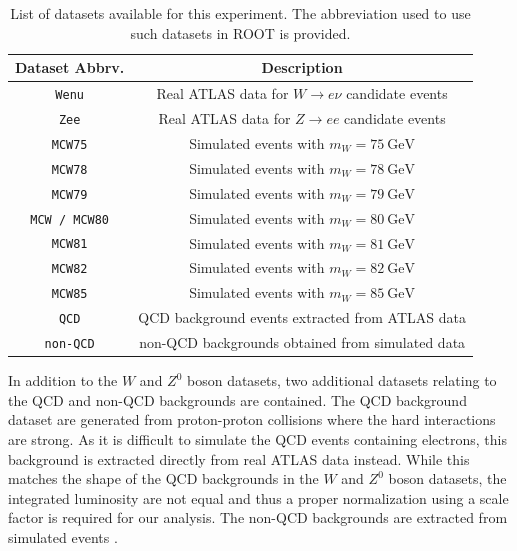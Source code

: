 \documentclass[a4paper]{report}
\numberwithin{equation}{section}
\begin{document}
\begin{table}
    \centering
    \begin{tabular}{|c|c|}  \hline
     Dataset Abbrv.& Description    \\ \hline
     \texttt{Wenu} &  Real ATLAS data for  $W \rightarrow e\nu$ candidate events \\
     \texttt{Zee} &  Real ATLAS data for  $Z \rightarrow ee$ candidate events  \\ 
     \texttt{MCW75} &  Simulated events with $m_W = \SI{75}{\giga\electronvolt}$ \\ 
     \texttt{MCW78} &  Simulated events with $m_W = \SI{78}{\giga\electronvolt}$ \\ 
     \texttt{MCW79} &  Simulated events with $m_W = \SI{79}{\giga\electronvolt}$ \\ 
     \texttt{MCW / MCW80} &  Simulated events with $m_W = \SI{80}{\giga\electronvolt}$ \\ 
     \texttt{MCW81} &  Simulated events with $m_W = \SI{81}{\giga\electronvolt}$ \\ 
     \texttt{MCW82} &  Simulated events with $m_W = \SI{82}{\giga\electronvolt}$ \\ 
     \texttt{MCW85} &  Simulated events with $m_W = \SI{85}{\giga\electronvolt}$ \\ 
     \texttt{QCD} & QCD background events extracted from ATLAS data \\ 
     \texttt{non-QCD} & non-QCD backgrounds obtained from simulated data \\ \hline
    \end{tabular}
    \caption{List of datasets available for this experiment. The abbreviation used to use such datasets in ROOT is 
    provided.}
    \label{tab:datasets}
\end{table}

In addition to the $W$ and $Z^0$ boson datasets, two additional datasets relating to the QCD and non-QCD backgrounds are contained. The QCD
background dataset are generated from proton-proton collisions where the hard interactions are strong. As it is difficult to 
simulate the QCD events containing electrons, this background is extracted directly from real ATLAS data instead. While this matches the 
shape of the QCD backgrounds in the $W$ and $Z^0$ boson datasets, the integrated luminosity are not equal and thus a proper normalization
using a scale factor is required for our analysis. The non-QCD backgrounds are extracted from simulated events \cite{labman}. \par 
\end{document}
